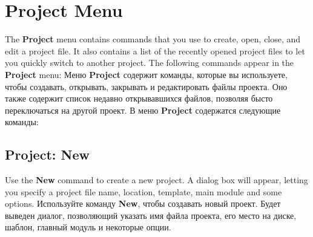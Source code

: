 \section{Project Menu}
\nominitoc

\ifenglish
The {\bf Project} menu contains commands that you use to create,
open, close, and edit a project file. It also contains a list 
of the recently opened project files to let you quickly switch
to another project. The following commands appear
in the {\bf Project} menu:
\else
Меню {\bf Project} содержит команды, которые вы используете, чтобы создавать,
открывать, закрывать и редактировать файлы проекта. Оно также содержит список
недавно открывавшихся файлов, позволяя бысто переключаться на другой проект.
В меню {\bf Project} содержатся следующие команды:
\fi
{}

\subsection{Project: New}

\ifenglish
Use the {\bf New} command to create a new project. A dialog
box will appear, letting you specify a project file name,
location, template, main module and some options.
\else
Используйте команду {\bf New}, чтобы создавать новый проект. Будет
выведен диалог, позволяющий указать имя файла проекта, его место на диске,
шаблон, главный модуль и некоторые опции.
\fi
